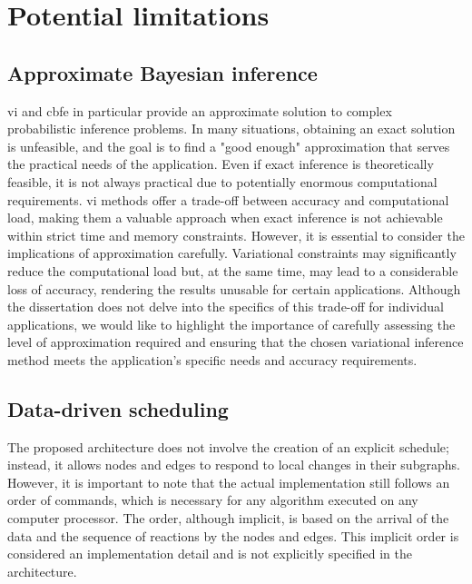 \section{Potential limitations}\label{chapter-06:section:discussion}

\subsection{Approximate Bayesian inference}

\Ac{vi} and \ac{cbfe} in particular provide an approximate solution to complex
probabilistic inference problems.
In many situations, obtaining an exact solution is unfeasible, and the goal is
to find a "good enough" approximation that serves the practical needs of the application.
Even if exact inference is theoretically feasible, it is not always practical 
due to potentially enormous computational requirements.
\Ac{vi} methods offer a trade-off between accuracy and computational load, making
them a valuable approach when exact inference is not achievable within strict time and memory
constraints.
However, it is essential to consider the implications of approximation carefully. Variational constraints
may significantly reduce the computational load but, at the same time, may lead to a considerable loss of accuracy, rendering the results unusable for certain applications.
Although the dissertation does not delve into the specifics of this trade-off for individual
applications, we would like to highlight the importance of carefully assessing the level of
approximation required and ensuring that the chosen variational inference method meets the
application's specific needs and accuracy requirements.

\subsection{Data-driven scheduling}

The proposed architecture does not involve the creation of an explicit schedule; instead, it
allows nodes and edges to respond to local changes in their subgraphs. 
However, it is important to note that the actual implementation still follows an order
of commands, which is necessary for any algorithm executed on any computer processor. 
The order, although implicit, is based on the arrival of the data and the sequence of reactions 
by the nodes and edges.
This implicit order is considered an implementation detail and is not explicitly specified in the
architecture.

